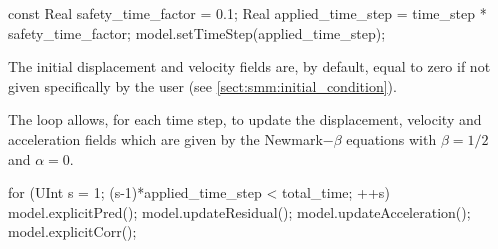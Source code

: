\documentclass[a4paper,11pt]{book}
\begin{document}
\begin{cpp}
  const Real safety_time_factor = 0.1;
  Real applied_time_step = time_step * safety_time_factor;
  model.setTimeStep(applied_time_step);
\end{cpp}

The initial displacement  and velocity fields are, by default,  equal to zero if
not given specifically by the user (see \ref{sect:smm:initial_condition}).

The loop  allows, for each time  step, to update the  displacement, velocity and
acceleration  fields  which are  given  by  the  Newmark$-\beta$ equations  with
$\beta=1/2$ and $\alpha=0$.

\begin{cpp}
  for (UInt s = 1; (s-1)*applied_time_step < total_time; ++s) {
    model.explicitPred();
    model.updateResidual();
    model.updateAcceleration();
    model.explicitCorr();
  }
\end{cpp}
\end{document}
